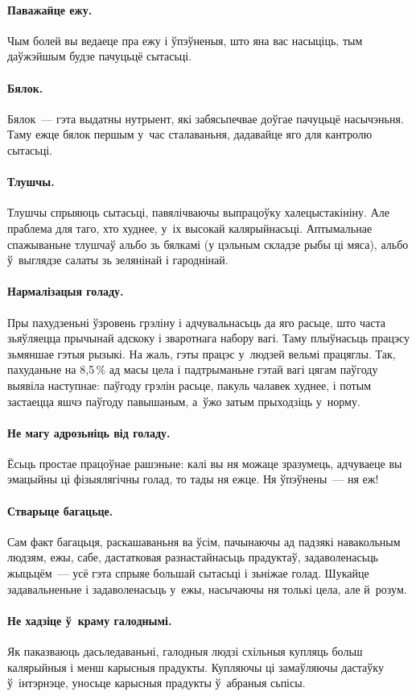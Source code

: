 \paragraph{Паважайце ежу.}
Чым болей вы ведаеце пра ежу і ўпэўненыя, што яна вас насыціць, тым даўжэйшым будзе пачуцьцё сытасьці.

\paragraph{Бялок.}
Бялок~--- гэта выдатны нутрыент, які забясьпечвае доўгае пачуцьцё насычэньня. Таму ежце бялок першым у~час сталаваньня, дадавайце яго для кантролю сытасьці.

\paragraph{Тлушчы.}
Тлушчы спрыяюць сытасьці, павялічваючы выпрацоўку халецыстакініну. Але праблема для таго, хто худнее, у~іх высокай калярыйнасьці. Аптымальнае спажываньне тлушчаў альбо зь бялкамі (у цэльным складзе рыбы ці мяса), альбо ў~выглядзе салаты зь зелянінай і гароднінай.

\paragraph{Нармалізацыя голаду.}
Пры пахудзеньні ўзровень грэліну і адчувальнасьць да яго расьце, што часта зьяўляецца прычынай адскоку і зваротнага набору вагі. Таму плыўнасьць працэсу зьмяншае гэтыя рызыкі. На жаль, гэты працэс у~людзей вельмі працяглы. Так, пахуданьне на 8,5\,\% ад масы цела і падтрыманьне гэтай вагі  цягам паўгоду выявіла наступнае: паўгоду грэлін расьце, пакуль чалавек худнее, і потым застаецца яшчэ паўгоду павышаным, а~ўжо затым прыходзіць у~норму.

\paragraph{Не магу адрозьніць від голаду.}
Ёсьць простае працоўнае рашэньне: калі вы ня можаце зразумець, адчуваеце вы эмацыйны ці фізыялягічны голад, то тады ня ежце. Ня ўпэўнены~--- ня еж!

\paragraph{Стварыце багацьце.}
Сам факт багацьця, раскашаваньня ва ўсім, пачынаючы ад падзякі навакольным людзям, ежы, сабе, дастатковая разнастайнасьць прадуктаў, задаволенасьць жыцьцём~--- усё гэта спрыяе большай сытасьці і зьніжае голад. Шукайце задавальненьне і задаволенасьць у~ежы, насычаючы ня толькі цела, але й~розум.

\paragraph{Не хадзіце ў~краму галоднымі.}
Як паказваюць дасьледаваньні, галодныя людзі схільныя купляць больш калярыйныя і менш карысныя прадукты. Купляючы ці замаўляючы дастаўку ў~інтэрнэце, уносьце карысныя прадукты ў~абраныя сьпісы.

